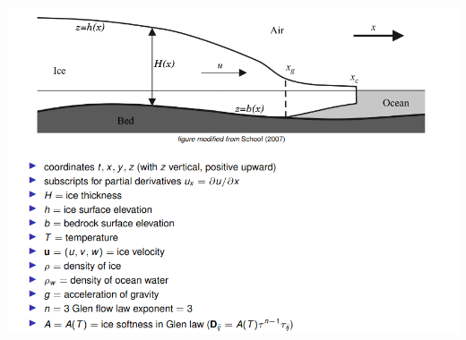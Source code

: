 

\begin{Figure}
\includegraphics[width=0.9\linewidth]{numerical_modelling_of_glaciers.png}
\label{fig:parameters}
\end{Figure}

